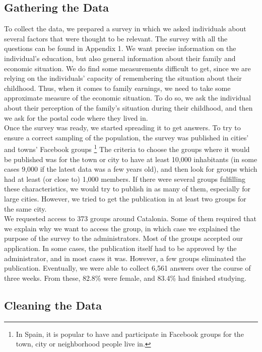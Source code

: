 \documentclass[12pt]{article}
\begin{document}
\subsection{Gathering the Data}

To collect the data, we prepared a survey in which we asked individuals about several factors that were thought to be relevant. The survey with all the questions can be found in Appendix 1. We want precise information on the individual's education, but also general information about their family and economic situation. We do find some measurements difficult to get, since we are relying on the individuals' capacity of remembering the situation about their childhood. Thus, when it comes to family earnings, we need to take some approximate measure of the economic situation. To do so, we ask the individual about their perception of the family's situation during their childhood, and then we ask for the postal code where they lived in. \\
Once the survey was ready, we started spreading it to get answers. To try to ensure a correct sampling of the population, the survey was published in cities' and towns' Facebook groups \footnote{In Spain, it is popular to have and participate in Facebook groups for the town, city or neighborhood people live in.} The criteria to choose the groups where it would be published was for the town or city to have at least 10,000 inhabitants (in some cases 9,000 if the latest data was a few years old), and then look for groups which had at least (or close to) 1,000 members. If there were several groups fulfilling these characteristics, we would try to publish in as many of them, especially for large cities. However, we tried to get the publication in at least two groups for the same city.\\
We requested access to 373 groups around Catalonia. Some of them required that we explain why we want to access the group, in which case we explained the purpose of the survey to the administrators. Most of the groups accepted our application. In some cases, the publication itself had to be approved by the administrator, and in most cases it was. However, a few groups eliminated the publication. Eventually, we were able to collect 6,561 answers over the course of three weeks. From these, 82.8\% were female, and 83.4\% had finished studying.

\subsection{Cleaning the Data}
\end{document}
